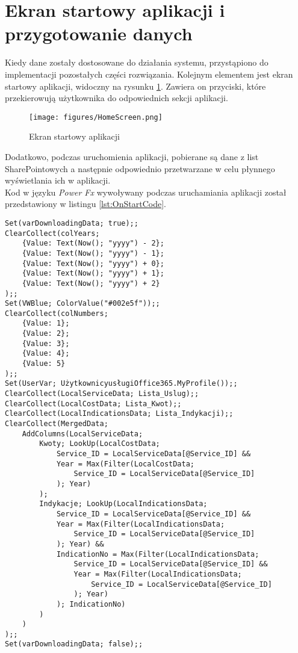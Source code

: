 \section{Ekran startowy aplikacji i przygotowanie danych}
Kiedy dane zostały dostosowane do działania systemu, przystąpiono do implementacji pozostałych części rozwiązania.
Kolejnym elementem jest ekran startowy aplikacji, widoczny na rysunku \ref{fig:homescreen}. Zawiera on przyciski, które przekierowują użytkownika do odpowiednich sekcji aplikacji.

\begin{figure}[h]
    \centering
    \texttt{[image: figures/HomeScreen.png]}
    \caption{Ekran startowy aplikacji} 
    \label{fig:homescreen}
\end{figure}

Dodatkowo, podczas uruchomienia aplikacji, pobierane są dane z list SharePointowych a następnie odpowiednio przetwarzane w celu płynnego wyświetlania ich w aplikacji. \\
Kod w języku \emph{Power Fx} wywoływany podczas uruchamiania aplikacji został przedstawiony w listingu \ref{lst:OnStartCode}.

\begin{lstlisting}[language=PowerFx]
Set(varDownloadingData; true);;
ClearCollect(colYears; 
    {Value: Text(Now(); "yyyy") - 2}; 
    {Value: Text(Now(); "yyyy") - 1}; 
    {Value: Text(Now(); "yyyy") + 0}; 
    {Value: Text(Now(); "yyyy") + 1}; 
    {Value: Text(Now(); "yyyy") + 2}
);;
Set(VWBlue; ColorValue("#002e5f"));;
ClearCollect(colNumbers; 
    {Value: 1}; 
    {Value: 2}; 
    {Value: 3}; 
    {Value: 4}; 
    {Value: 5}
);;
Set(UserVar; UżytkownicyusługiOffice365.MyProfile());;
ClearCollect(LocalServiceData; Lista_Uslug);;
ClearCollect(LocalCostData; Lista_Kwot);;
ClearCollect(LocalIndicationsData; Lista_Indykacji);;
ClearCollect(MergedData; 
    AddColumns(LocalServiceData; 
        Kwoty; LookUp(LocalCostData; 
            Service_ID = LocalServiceData[@Service_ID] && 
            Year = Max(Filter(LocalCostData; 
                Service_ID = LocalServiceData[@Service_ID]
            ); Year)
        ); 
        Indykacje; LookUp(LocalIndicationsData; 
            Service_ID = LocalServiceData[@Service_ID] && 
            Year = Max(Filter(LocalIndicationsData; 
                Service_ID = LocalServiceData[@Service_ID]
            ); Year) && 
            IndicationNo = Max(Filter(LocalIndicationsData; 
                Service_ID = LocalServiceData[@Service_ID] && 
                Year = Max(Filter(LocalIndicationsData; 
                    Service_ID = LocalServiceData[@Service_ID]
                ); Year)
            ); IndicationNo)
        )
    )
);;
Set(varDownloadingData; false);;
\end{lstlisting}

